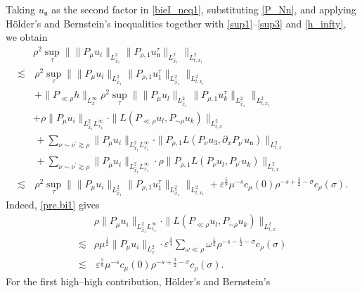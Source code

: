 \documentclass[11pt,letterpaper,reqno]{amsart}
\numberwithin{equation}{section}
\theoremstyle{definition}
\theoremstyle{remark}
\begin{document}
 Taking \(u_{\mathfrak n}\) as the second factor in
\eqref{bieI_neq1}, substituting \eqref{P_Nn}, and applying H\"older's
and Bernstein's inequalities together with
\eqref{sup1}--\eqref{sup3} and \eqref{h_infty}, we obtain
\begin{align}
	& \rho^2  \sup_{\tau} \big\| \|P_\mu u_{i}\|_{L^2_{\widehat{x}_1}}  \| P_{\rho,1} u_{\mathfrak{n}}^{\tau}\|_{L^2_{\widehat{x}_1}}  \big\|_{L^2_{t,x_1}}\nonumber\\
    \lesssim &\,  \rho^2 \sup_{\tau} \big\| \|P_\mu u_{i}\|_{L^2_{\widehat{x}_1}}  \| P_{\rho,1} u_1^\tau\|_{L^2_{\widehat{x}_1}}  \big\|_{L^2_{t,x_1}}\nonumber\\
   &\, +  \| P_{\ll \rho} h\|_{L^\infty_x}    \rho^2  \sup_{\tau} \big\| \|P_\mu u_{l}\|_{L^2_{\widehat{x}_1}}  \| P_{\rho,1} u_{k}^{\tau}\|_{L^2_{\widehat{x}_1}}  \big\|_{L^2_{t,x_1}}\nonumber\\
    &+   \rho    \|P_\mu u_{i}\|_{L^2_{\widehat{x}_1} L^\infty_{x_1}}  \cdot    \|  L( P_{\ll \rho} u_l, P_{\sim \rho} u_{k}  )  \big\|_{L^2_{t,x}} \nonumber\\
       &\, +\sum_{\nu \sim \nu^\prime \gtrsim \rho}   \|P_\mu u_{i}\|_{L^2_{\widehat{x}_1} L^\infty_{x_1}}  \cdot    \| P_{\rho,1} L (P_{\nu} u_3,   \partial_x  P_{\nu^\prime }
u_{\mathfrak{n}}) \big\|_{L^2_{t,x}} \nonumber\\ 
&\, +\sum_{\nu \sim \nu^\prime \gtrsim \rho}  \|P_\mu u_{i}\|_{L^2_{\widehat{x}_1} L^\infty_{x_1}}  \cdot  \rho   \| P_{\rho,1} L (P_{\nu} u_l,     P_{\nu^\prime }
u_k) \big\|_{L^2_{t,x}} \nonumber\\ 
	\lesssim &\, \rho^2 \sup_{\tau} \big\| \|P_\mu u_{i}\|_{L^2_{\widehat{x}_1}}  \| P_{\rho,1} u_1^\tau\|_{L^2_{\widehat{x}_1}}  \big\|_{L^2_{t,x_1}}+\varepsilon^{\frac58}\mu^{-s} c_\mu(0) \rho^{-s+\frac 32 -\sigma} c_\rho(\sigma). \label{bieI_neq2}
\end{align}
Indeed, \eqref{pre.bi1} gives
\begin{align*}
    &  \rho     \|P_\mu u_{i}\|_{L^2_{\widehat{x}_1} L^\infty_{x_1}}  \cdot    \|  L( P_{\ll \rho} u_l, P_{\sim \rho} u_{k}  )  \big\|_{L^2_{t,x}}\\
    \lesssim & \rho  \mu^{\frac 12} \|P_\mu u_{i}\|_{L^2_{x}} \cdot \varepsilon^{\frac 34}\sum_{\omega\ll \rho}  \omega^{\frac 12}   \rho^{-s-\frac12-\sigma} c_{\rho} (\sigma) \\
    \lesssim &\, \varepsilon^{\frac58}\mu^{-s} c_\mu(0) \rho^{-s+\frac 32 -\sigma} c_\rho(\sigma).
   \end{align*}
   For the first high--high contribution, H\"older's and Bernstein's
\end{document}
